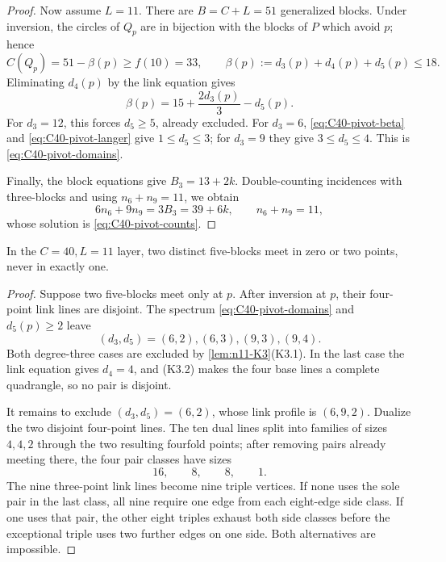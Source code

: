 \begin{proof}
Now assume \(L=11\).  There are \(B=C+L=51\) generalized blocks.  Under
inversion, the circles of \(Q_p\) are in bijection with the blocks of \(P\)
which avoid \(p\); hence
\[
 C(Q_p)=51-\beta(p)\ge f(10)=33,\qquad
 \beta(p):=d_3(p)+d_4(p)+d_5(p)\le18.
\]
Eliminating \(d_4(p)\) by the link equation gives
\begin{equation}\label{eq:C40-pivot-beta}
 \beta(p)=15+\frac{2d_3(p)}3-d_5(p).
\end{equation}
For \(d_3=12\), this forces \(d_5\ge5\), already excluded.  For
\(d_3=6\), \eqref{eq:C40-pivot-beta} and
\eqref{eq:C40-pivot-langer} give \(1\le d_5\le3\); for \(d_3=9\) they give
\(3\le d_5\le4\).  This is \eqref{eq:C40-pivot-domains}.

Finally, the block equations give \(B_3=13+2k\).  Double-counting incidences
with three-blocks and using \(n_6+n_9=11\), we obtain
\[
 6n_6+9n_9=3B_3=39+6k,\qquad n_6+n_9=11,
\]
whose solution is \eqref{eq:C40-pivot-counts}.
\end{proof}

\begin{lemma}[$C=40,L=11$ singleton exclusion]
\label{lem:n11-C40-no-singletons}
In the $C=40,L=11$ layer, two distinct five-blocks meet in zero or two
points, never in exactly one.
\end{lemma}

\begin{proof}
Suppose two five-blocks meet only at $p$.  After inversion at $p$, their
four-point link lines are disjoint.  The spectrum
\eqref{eq:C40-pivot-domains} and $d_5(p)\ge2$ leave
\[
 (d_3,d_5)=(6,2),(6,3),(9,3),(9,4).
\]
Both degree-three cases are excluded by \cref{lem:n11-K3}(K3.1).  In the
last case the link equation gives $d_4=4$, and (K3.2) makes the four base
lines a complete quadrangle, so no pair is disjoint.

It remains to exclude $(d_3,d_5)=(6,2)$, whose link profile is $(6,9,2)$.
Dualize the two disjoint four-point lines.  The ten dual lines split into
families of sizes $4,4,2$ through the two resulting fourfold points; after
removing pairs already meeting there, the four pair classes have sizes
\[
 16,\qquad8,\qquad8,\qquad1.
\]
The nine three-point link lines become nine triple vertices.  If none uses
the sole pair in the last class, all nine require one edge from each
eight-edge side class.  If one uses that pair, the other eight triples
exhaust both side classes before the exceptional triple uses two further
edges on one side.  Both alternatives are impossible.
\end{proof}

